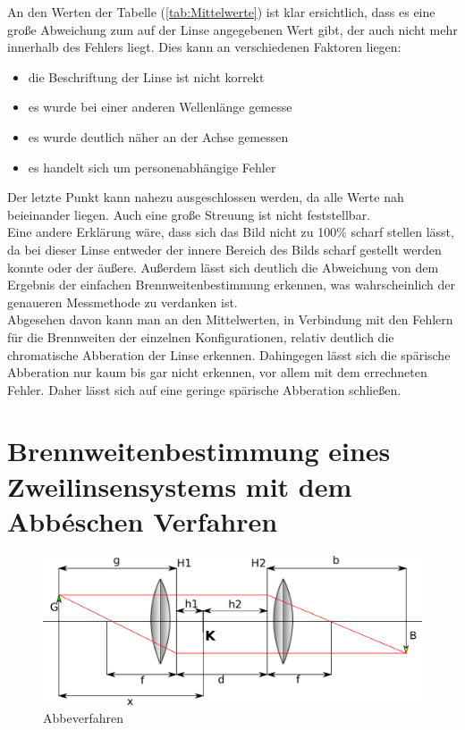 An den Werten der Tabelle (\ref{tab:Mittelwerte}) ist klar ersichtlich, dass es eine große Abweichung zum auf der Linse angegebenen Wert gibt, der auch nicht mehr innerhalb des Fehlers liegt. Dies kann an verschiedenen Faktoren liegen: \\

\begin{itemize}
\item die Beschriftung der Linse ist nicht korrekt
\item es wurde bei einer anderen Wellenlänge gemesse
\item es wurde deutlich näher an der Achse gemessen
\item es handelt sich um personenabhängige Fehler
\end{itemize}

Der letzte Punkt kann nahezu ausgeschlossen werden, da alle Werte nah beieinander liegen.
Auch eine große Streuung ist nicht feststellbar.\\
Eine andere Erklärung wäre, dass sich das Bild nicht zu 100\% scharf stellen lässt, da bei dieser Linse entweder der innere Bereich des Bilds scharf gestellt werden konnte oder der äußere. Außerdem lässt sich deutlich die Abweichung von dem Ergebnis der einfachen Brennweitenbestimmung erkennen, was wahrscheinlich der genaueren Messmethode zu verdanken ist.\\
Abgesehen davon kann man an den Mittelwerten, in Verbindung mit den Fehlern für die Brennweiten der einzelnen Konfigurationen, relativ deutlich die chromatische Abberation der Linse erkennen. Dahingegen lässt sich die spärische Abberation nur kaum bis gar nicht erkennen, vor allem mit dem errechneten Fehler. Daher lässt sich auf eine geringe spärische Abberation schließen.


\section{Brennweitenbestimmung eines Zweilinsensystems mit dem Abbéschen Verfahren}

\begin{figure}[h!]
    \centering
    \includegraphics[scale=0.8]{Geometrische_Optik/Protokoll/fig/Abbeverfahren.png}
    \caption{Abbeverfahren}
    \label{fig:Abbeverfahren}
\end{figure}

